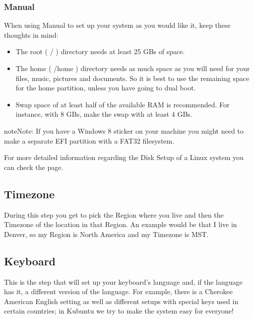 \documentclass[letterpaper,10pt,english]{sphinxmanual}
\begin{document}
\subsubsection{Manual}
\label{\detokenize{docs/installation:manual}}
\sphinxAtStartPar
When using Manual to set up your system as you would like it, keep these thoughts in mind:
\begin{itemize}
\item {} 
\sphinxAtStartPar
The root ( / ) directory needs at least 25 GBs of space.

\item {} 
\sphinxAtStartPar
The home ( /home ) directory needs as much space as you will need for your files, music, pictures and documents.
So it is best to use the remaining space for the home partition, unless you have going to dual boot.

\item {} 
\sphinxAtStartPar
Swap space of at least half of the available RAM is recommended. For instance, with 8 GBs, make the swap with at least 4 GBs.

\end{itemize}

\begin{sphinxadmonition}{note}{Note:}
\sphinxAtStartPar
If you have a Windows 8 sticker on your machine you might need to make a separate EFI partition with a FAT32 filesystem.
\end{sphinxadmonition}

\sphinxAtStartPar
For more detailed information regarding the Disk Setup of a Linux system you can check the  page.


\subsection{Timezone}
\label{\detokenize{docs/installation:timezone}}
\sphinxAtStartPar
During this step you get to pick the Region where you live and then the Timezone of the location in that Region. An example would be that I live in Denver, so my Region is North America and my Timezone is MST.



\subsection{Keyboard}
\label{\detokenize{docs/installation:keyboard}}
\sphinxAtStartPar
This is the step that will set up your keyboard’s language and, if the language has it, a different version of the language. For example, there is a Cherokee American English setting as well as different setups with special keys used in certain countries; in Kubuntu we try to make the system easy for everyone!
\end{document}
